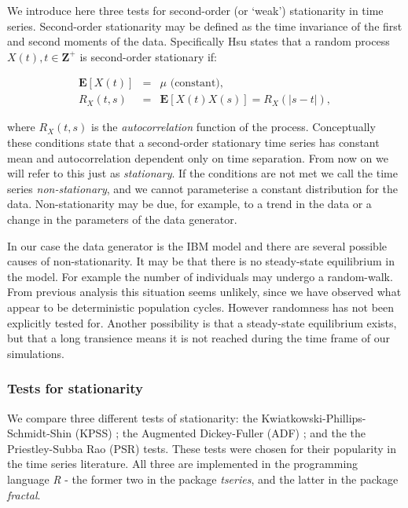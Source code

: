 We introduce here three tests for second-order (or `weak') stationarity in time series.  Second-order stationarity may be defined as the time invariance of the first and second moments of the data. Specifically Hsu \cite{hsu1997schaum} states that a random process $X(t), t \in \mathbf{Z}^+$ is second-order stationary if:

\begin{eqnarray*}
	\mathbf{E}[X(t)] &=& \mu \text{ (constant),} \\
	R_X(t,s) &=& \mathbf{E}[X(t)X(s)] = R_X(|s-t|), 
\end{eqnarray*}

where $R_X(t,s)$ is the \emph{autocorrelation} function of the process. Conceptually these conditions state that a second-order stationary time series has constant mean and autocorrelation dependent only on time separation. From now on we will refer to this just as \emph{stationary}. If the conditions are not met we call the time series \emph{non-stationary}, and we cannot parameterise a constant distribution for the data. Non-stationarity may be due, for example, to a trend in the data or a change in the parameters of the data generator. 

In our case the data generator is the IBM model and there are several possible causes of non-stationarity. It may be that there is no steady-state equilibrium in the model. For example the number of individuals may undergo a random-walk. From previous analysis this situation seems unlikely, since we have observed what appear to be deterministic population cycles. However randomness has not been explicitly tested for. Another possibility is that a steady-state equilibrium exists, but that a long transience  means it is not reached during the time frame of our simulations.


\subsubsection{Tests for stationarity}
\label{sec:stat_tests}

We compare three different tests of stationarity: the Kwiatkowski-Phillips-Schmidt-Shin (KPSS) \cite{kwiatkowski1992testing}; the Augmented Dickey-Fuller (ADF) \cite{said1984testing}; and the the Priestley-Subba Rao (PSR) \cite{priestley1969test} tests. These tests were chosen for their popularity in the time series literature. All three are implemented in the programming language \emph{R} \cite{Rlanguage} - the former two in the package \emph{tseries}, and the latter in the package \emph{fractal}.

